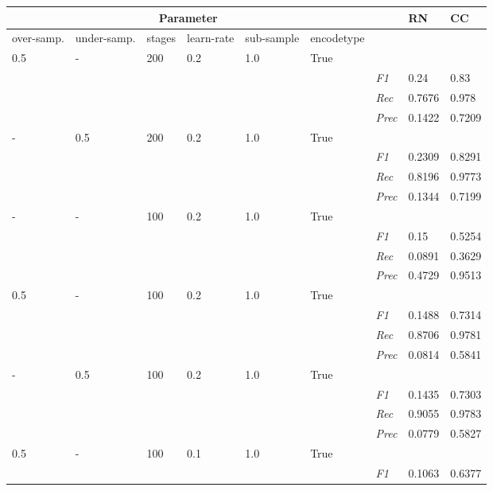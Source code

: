 \begin{table}[]
\tiny
\tabcolsep=0.11cm
\begin{tabularx}{\textwidth}{XXXXXX|X|X|X}
\toprule
\multicolumn{6}{c}{Parameter} & & RN &  CC \\ \midrule
over-\newline samp. & under-\newline samp. & stages &learn-\newline rate & sub-\newline sample & encode\newline type & & &  \\ \midrule
0.5 & - & 200 & 0.2 & 1.0 &True & & &  \\
& & & & & & \textit{F1} & 0.24 & 0.83        \\
& & & & & & \textit{Rec} &  0.7676 & 0.978    \\
& & & & & & \textit{Prec} & 0.1422 & 0.7209  \\ \midrule
- & 0.5 & 200 & 0.2 & 1.0 &True & & &  \\
& & & & & & \textit{F1} & 0.2309 & 0.8291        \\
& & & & & & \textit{Rec} &  0.8196 & 0.9773    \\
& & & & & & \textit{Prec} & 0.1344 & 0.7199  \\ \midrule
- & - & 100 & 0.2 & 1.0 &True & & &  \\
& & & & & & \textit{F1} & 0.15 & 0.5254        \\
& & & & & & \textit{Rec} &  0.0891 & 0.3629    \\
& & & & & & \textit{Prec} & 0.4729 & 0.9513  \\ \midrule
0.5 & - & 100 & 0.2 & 1.0 &True & & &  \\
& & & & & & \textit{F1} & 0.1488 & 0.7314        \\
& & & & & & \textit{Rec} &  0.8706 & 0.9781    \\
& & & & & & \textit{Prec} & 0.0814 & 0.5841  \\ \midrule
- & 0.5 & 100 & 0.2 & 1.0 &True & & &  \\
& & & & & & \textit{F1} & 0.1435 & 0.7303        \\
& & & & & & \textit{Rec} &  0.9055 & 0.9783    \\
& & & & & & \textit{Prec} & 0.0779 & 0.5827  \\ \midrule
0.5 & - & 100 & 0.1 & 1.0 &True & & &  \\
& & & & & & \textit{F1} & 0.1063 & 0.6377        \\

\end{tabularx}
\end{table}
